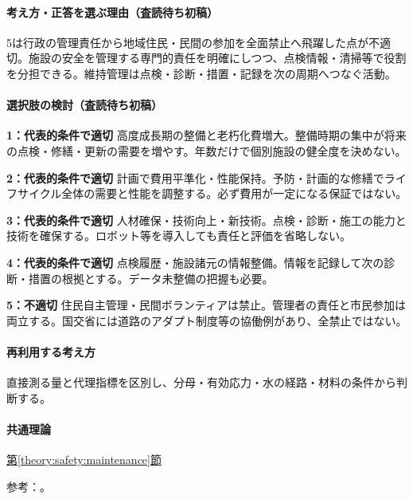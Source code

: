 \paragraph{考え方・正答を選ぶ理由（査読待ち初稿）} 5は行政の管理責任から地域住民・民間の参加を全面禁止へ飛躍した点が不適切。施設の安全を管理する専門的責任を明確にしつつ、点検情報・清掃等で役割を分担できる。維持管理は点検・診断・措置・記録を次の周期へつなぐ活動。

\paragraph{選択肢の検討（査読待ち初稿）}\mbox{}\par

\noindent\textbf{1：代表的条件で適切} 高度成長期の整備と老朽化費増大。整備時期の集中が将来の点検・修繕・更新の需要を増やす。年数だけで個別施設の健全度を決めない。\par

\noindent\textbf{2：代表的条件で適切} 計画で費用平準化・性能保持。予防・計画的な修繕でライフサイクル全体の需要と性能を調整する。必ず費用が一定になる保証ではない。\par

\noindent\textbf{3：代表的条件で適切} 人材確保・技術向上・新技術。点検・診断・施工の能力と技術を確保する。ロボット等を導入しても責任と評価を省略しない。\par

\noindent\textbf{4：代表的条件で適切} 点検履歴・施設諸元の情報整備。情報を記録して次の診断・措置の根拠とする。データ未整備の把握も必要。\par

\noindent\textbf{5：不適切} 住民自主管理・民間ボランティアは禁止。管理者の責任と市民参加は両立する。国交省には道路のアダプト制度等の協働例があり、全禁止ではない。\par

\paragraph{再利用する考え方} 直接測る量と代理指標を区別し、分母・有効応力・水の経路・材料の条件から判断する。

\paragraph{共通理論} \hyperref[theory:safety:maintenance]{第\ref*{theory:safety:maintenance}節}

\par 参考：\cite{eng52_infra2014,eng52_adopt}。

